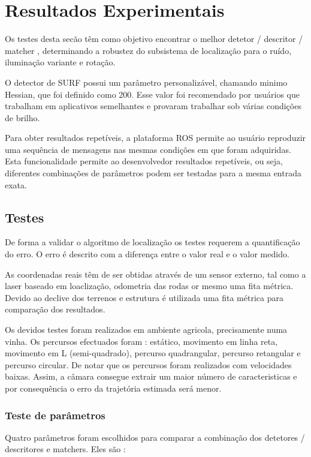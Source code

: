 \chapter{Resultados Experimentais} \label{chap:resexp}


Os testes desta secão têm como objetivo encontrar o melhor detetor / descritor / matcher , determinando a robustez do subsistema de localização para o ruído, iluminação variante e rotação.

O detector de SURF possui um parâmetro personalizável, chamando minimo Hessian, que foi definido como 200. Esse valor foi recomendado por usuários que trabalham em aplicativos semelhantes e provaram trabalhar sob várias condições de brilho.

Para obter resultados repetíveis, a plataforma ROS permite ao usuário reproduzir uma sequência de mensagens nas mesmas condições em que foram adquiridas. Esta funcionalidade permite ao desenvolvedor resultados repetíveis, ou seja, diferentes combinações de parâmetros podem ser testadas para a mesma entrada exata.

\section{Testes}

De forma a validar o algoritmo de localização os testes requerem a quantificação do erro. O erro é descrito com a diferença entre o valor real e o valor medido.

As coordenadas reais têm de ser obtidas através de um sensor externo, tal como a laser baseado em loaclização, odometria das rodas or mesmo uma fita métrica. Devido ao declive dos terrenos e estrutura é utilizada uma fita métrica para comparação dos resultados.

Os devidos testes foram realizados em ambiente agricola, precisamente numa vinha. Os percursos efectuados foram : estático, movimento em linha reta, movimento em L (semi-quadrado), percurso quadrangular, percurso retangular e percurso circular. De notar que os percursos foram realizados com velocidades baixas. Assim, a câmara consegue extrair um maior número de caracteristicas e por consequência o erro da trajetória estimada será menor.  


\subsection{Teste de parâmetros}

Quatro parâmetros foram escolhidos para comparar a combinação dos detetores / descritores e matchers. Eles são :

